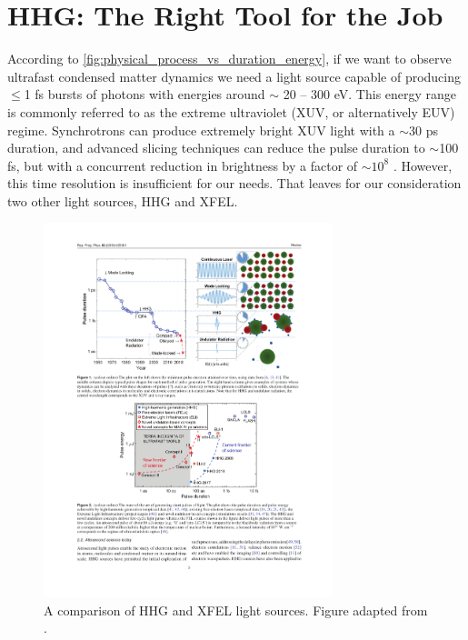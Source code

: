 
%
%
%
%
%




\section{HHG: The Right Tool for the Job}

According to \cref{fig:physical_process_vs_duration_energy}, if we want to observe ultrafast condensed matter dynamics we need a light source capable of producing $\le$1 fs bursts of photons with energies around {$\sim$ 20 -- 300 eV}. This energy range is commonly referred to as the extreme ultraviolet (XUV, or alternatively EUV) regime. Synchrotrons can produce extremely bright XUV light with a $\sim$30 ps duration, and advanced slicing techniques can reduce the pulse duration to {$\sim$100 fs}, but with a concurrent reduction in brightness by a factor of $\sim 10^{8}$ \cite{schoenleinGenerationFemtosecondPulses2000}. However, this time resolution is insufficient for our needs. That leaves for our consideration two other light sources, HHG and XFEL.

\begin{figure}
	\centering
	\includegraphics[width=0.75\textwidth]{figures/chap1/HHG_vs_XFEL_2.pdf}
	\caption{A comparison of HHG and XFEL light sources. Figure adapted from \cite{makAttosecondSinglecycleUndulator2019}.}
	\label{fig:HHG_vs_XFEL}
\end{figure}

